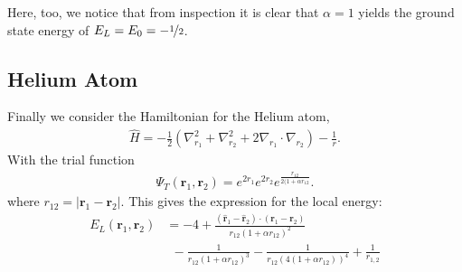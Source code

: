 Here, too, we notice that from inspection it is clear that $\alpha = 1$ yields the ground state energy of $E_L = E_0 = -\nicefrac{1}{2}$.


\subsection{Helium Atom}
Finally we consider the Hamiltonian for the Helium atom,
\begin{align*}
  \hat{H} = -\frac{1}{2}(\nabla_{r_1}^2 + \nabla_{r_2}^2 + 2\nabla_{r_1}\cdot \nabla_{r_2}) - \frac{1}{r}.
\end{align*}
With the trial function
  \begin{align*}
    \Psi_T (\textbf{r}_1,\textbf{r}_2) = e^{2r_1}e^{2r_2}e^{\frac{r_{12}}{2(1+\alpha r_{12}}}.
  \end{align*}
where $r_{12} =\left| \textbf{r}_1 - \textbf{r}_2 \right|$.
This gives the expression for the local energy:
  \begin{align*}
    E_L(\textbf{r}_1,\textbf{r}_2) &= -4  +
     \frac{(\hat{\textbf{r}}_1 - \hat{\textbf{r}}_2) \cdot (\textbf{r}_1 - \textbf{r}_2)}{r_{12}(1+\alpha r_{12})^2} \\
     &~~ -   \frac{1}{r_{12}(1+\alpha r_{12})^3}  - \frac{1}{r_{12}(4(1+\alpha r_{12}))^4} + \frac{1}{r_{1,2}}
  \end{align*}
